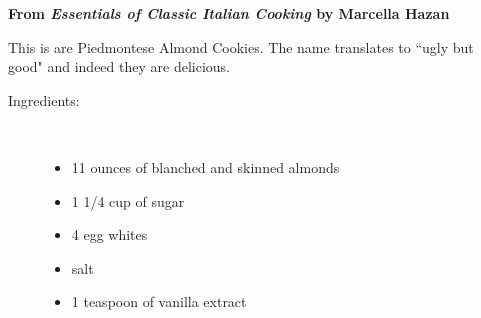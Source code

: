 \documentclass[11pt,letterpaper]{article}
\begin{document}


\begin{flushright}
{\bf From {\it Essentials of Classic Italian Cooking} by Marcella Hazan}
\end{flushright}

This is are Piedmontese Almond Cookies. The name translates to ``ugly but good" and indeed they are delicious.

\begin{description}

\item[Ingredients:]\ \\
	\begin{itemize}
	\item 11 ounces of blanched and skinned almonds
	\item 1 1/4 cup of sugar
	\item 4 egg whites
	\item salt
	\item 1 teaspoon of vanilla extract
	\end{itemize}


\end{description}
\end{document}
